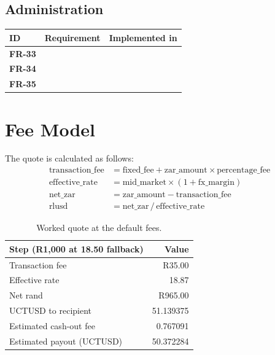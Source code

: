 \documentclass[11pt,a4paper]{article}
\makeatletter
\newenvironment{frtable}{%
  \rowcolors{2}{white}{rowbg}
  \begin{longtable}{@{}>{\bfseries}l >{\RaggedRight\arraybackslash}p{5.5cm} >{\RaggedRight\arraybackslash}p{8.4cm}@{}}
  \toprule
  \rowcolor{headbg}\textbf{ID} & \textbf{Requirement} & \textbf{Implemented in} \\
  \midrule
  \endhead
  \bottomrule
  \endlastfoot}
 {\end{longtable}}
\newcommand{\tablenote}[1]{{\small\color{ink}\itshape #1\par}}
\makeatother
\begin{document}
\subsection{Administration}
\begin{frtable}
FR-33 & & \\
FR-34 & & \\
FR-35 & & \\
\end{frtable}
\tablenote{%
}

\section{Fee Model}\label{sec:fees}

The quote is calculated as follows:
\begin{align*}
\text{transaction\_fee} &= \text{fixed\_fee} + \text{zar\_amount} \times \text{percentage\_fee}\\
\text{effective\_rate}  &= \text{mid\_market} \times (1 + \text{fx\_margin})\\
\text{net\_zar}         &= \text{zar\_amount} - \text{transaction\_fee}\\
\text{rlusd}            &= \text{net\_zar} \,/\, \text{effective\_rate}
\end{align*}


\begin{table}[H]
\centering\small
{}
\begin{tabular}{@{}lr@{}}
\toprule
\rowcolor{headbg}\textbf{Step (R1,000 at 18.50 fallback)} & \textbf{Value} \\
\midrule
Transaction fee            & R35.00 \\
Effective rate             & 18.87 \\
Net rand                   & R965.00 \\
UCTUSD to recipient        & 51.139375 \\
Estimated cash-out fee     & 0.767091 \\
Estimated payout (UCTUSD)  & 50.372284 \\
\bottomrule
\end{tabular}
\caption{Worked quote at the default fees.}
\label{tab:worked}
\end{table}
\end{document}

